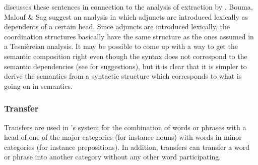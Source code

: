 \citet[]{Levine2003a} discusses these sentences in connection to the \hpsg analysis of
extraction by \citet*{BMS2001a}. Bouma, Malouf \& Sag suggest an analysis in which adjuncts are
introduced lexically as dependents of a certain head. Since adjuncts are introduced lexically, the
coordination structures basically have the same structure as the ones assumed in a
Tesnièreian analysis. It may be possible to come up with a way to get the semantic composition right
even though the syntax does not correspond to the semantic dependencies (see \citealp{Chaves2009a} for
suggestions), but it is clear that it is simpler to derive the semantics from a syntactic structure
which corresponds to what is going on in semantics. 

\subsubsection{Transfer}
\label{sec-transfer-dg}

Transfers are used in \tes's system for the combination of words or phrases with a head of one of
the major categories (for instance nouns) with words in minor categories (for instance
prepositions). In addition, transfers can transfer a word or phrase into another category without
any other word participating.

